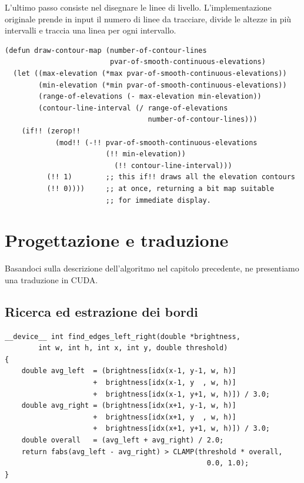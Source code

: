 \documentclass[12pt,a4paper,openright,twoside]{report}
\begin{document}
L'ultimo passo consiste nel disegnare le linee di livello. L'implementazione originale prende in input il numero di linee da tracciare, divide le altezze in più intervalli e traccia una linea per ogni intervallo.

\begin{lstlisting}[style=mystyle]
(defun draw-contour-map (number-of-contour-lines
                         pvar-of-smooth-continuous-elevations)
  (let ((max-elevation (*max pvar-of-smooth-continuous-elevations))
        (min-elevation (*min pvar-of-smooth-continuous-elevations))
        (range-of-elevations (- max-elevation min-elevation))
        (contour-line-interval (/ range-of-elevations
                                  number-of-contour-lines)))
    (if!! (zerop!!
            (mod!! (-!! pvar-of-smooth-continuous-elevations
                        (!! min-elevation))
                          (!! contour-line-interval)))
          (!! 1)        ;; this if!! draws all the elevation contours
          (!! 0))))     ;; at once, returning a bit map suitable
                        ;; for immediate display.
\end{lstlisting}

\chapter{Progettazione e traduzione}

Basandoci sulla descrizione dell'algoritmo nel capitolo precedente, ne presentiamo una traduzione in CUDA.

\section{Ricerca ed estrazione dei bordi}

\begin{lstlisting}[style=mystyle]
__device__ int find_edges_left_right(double *brightness,
        int w, int h, int x, int y, double threshold)
{
    double avg_left  = (brightness[idx(x-1, y-1, w, h)]
                     +  brightness[idx(x-1, y  , w, h)]
                     +  brightness[idx(x-1, y+1, w, h)]) / 3.0;
    double avg_right = (brightness[idx(x+1, y-1, w, h)]
                     +  brightness[idx(x+1, y  , w, h)]
                     +  brightness[idx(x+1, y+1, w, h)]) / 3.0;
    double overall   = (avg_left + avg_right) / 2.0;
    return fabs(avg_left - avg_right) > CLAMP(threshold * overall,
                                                0.0, 1.0);
}
\end{lstlisting}
\end{document}
